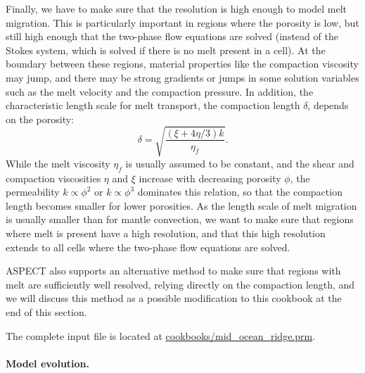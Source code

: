 \documentclass{article}
\newcommand{\aspect}{\textsc{ASPECT}}
\begin{document}
Finally, we have to make sure that the resolution is high enough to model melt migration. 
This is particularly important in regions where the porosity is low, but still high enough that 
the two-phase flow equations are solved (instead of the Stokes system, which is solved if there is  
no melt present in a cell). At the boundary between these regions, material properties like the 
compaction viscosity may jump, and there may be strong gradients or jumps in some solution variables such 
as the melt velocity and the compaction pressure. In addition, the characteristic length scale for melt transport, 
the compaction length $\delta$, depends on the porosity:
\begin{equation}
\delta = \sqrt{\frac{(\xi+4\eta/3)k}{\eta_f}}.
\end{equation}
While the melt viscosity $\eta_f$ is usually assumed to be constant, and the shear and compaction 
viscosities $\eta$ and  $\xi$ increase with decreasing porosity $\phi$, the permeability 
$k \propto \phi^2$ or $k \propto \phi^3$ dominates this relation, so that the compaction length becomes 
smaller for lower porosities. 
As the length scale of melt migration is usually smaller than for mantle convection, we want to make 
sure that regions where melt is present have a high resolution, and that this high resolution extends 
to all cells where the two-phase flow equations are solved. 



\aspect{} also supports an alternative method to make sure that regions with melt are sufficiently 
well resolved, relying directly on the compaction length, and we will discuss this method as a possible 
modification to this cookbook at the end of this section. 

The complete input file is located at \url{cookbooks/mid_ocean_ridge.prm}. 

\paragraph{Model evolution.}
\end{document}
